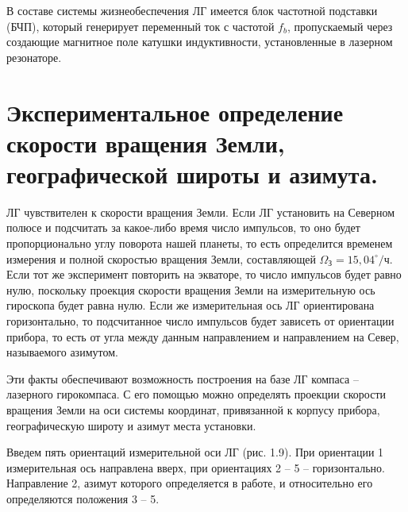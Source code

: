 \documentclass[a4paper,12pt]{article} %
\begin{document}
В составе системы жизнеобеспечения ЛГ имеется блок частотной подставки (БЧП), который генерирует переменный ток с частотой $f_b$, пропускаемый через создающие магнитное поле катушки индуктивности, установленные
в лазерном резонаторе.

\section{Экспериментальное определение скорости вращения Земли, географической широты и азимута.}

ЛГ чувствителен к скорости вращения Земли. Если ЛГ установить на Северном полюсе и подсчитать за какое-либо время число импульсов, то оно будет пропорционально углу поворота нашей планеты, то есть определится временем измерения и полной скоростью вращения Земли, составляющей $\Omega_\text{З} = 15,04^\circ/\text{ч}$. Если тот же эксперимент повторить на экваторе, то число импульсов будет равно нулю, поскольку проекция скорости
вращения Земли на измерительную ось гироскопа будет равна нулю. Если же
измерительная ось ЛГ ориентирована горизонтально, то подсчитанное число
импульсов будет зависеть от ориентации прибора, то есть от угла между данным направлением и направлением на Север, называемого азимутом.

Эти факты обеспечивают возможность построения на базе ЛГ компаса –
лазерного гирокомпаса. С его помощью можно определять проекции скорости вращения Земли на оси системы координат, привязанной к корпусу прибора, географическую широту и азимут места установки.

Введем пять ориентаций измерительной оси ЛГ (рис. 1.9). При ориентации
1 измерительная ось направлена вверх, при ориентациях 2 – 5 – горизонтально.
Направление 2, азимут которого определяется в работе, и относительно его определяются положения 3 – 5.
\end{document}

